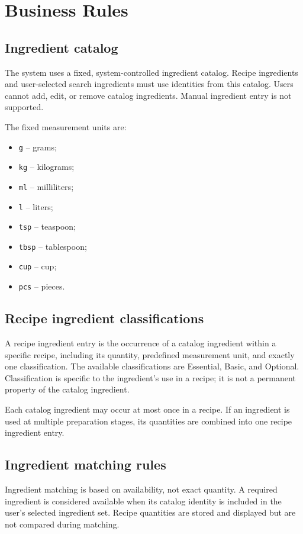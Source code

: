 \documentclass[12pt]{article}
\begin{document}
\section{Business Rules}

\subsection{Ingredient catalog}
The system uses a fixed, system-controlled ingredient catalog. Recipe ingredients and user-selected search ingredients must use identities from this catalog. Users cannot add, edit, or remove catalog ingredients. Manual ingredient entry is not supported.

The fixed measurement units are:
\begin{itemize}
    \item \texttt{g} -- grams;
    \item \texttt{kg} -- kilograms;
    \item \texttt{ml} -- milliliters;
    \item \texttt{l} -- liters;
    \item \texttt{tsp} -- teaspoon;
    \item \texttt{tbsp} -- tablespoon;
    \item \texttt{cup} -- cup;
    \item \texttt{pcs} -- pieces.
\end{itemize}

\subsection{Recipe ingredient classifications}
A recipe ingredient entry is the occurrence of a catalog ingredient within a specific recipe, including its quantity, predefined measurement unit, and exactly one classification. The available classifications are Essential, Basic, and Optional. Classification is specific to the ingredient's use in a recipe; it is not a permanent property of the catalog ingredient.

Each catalog ingredient may occur at most once in a recipe. If an ingredient is used at multiple preparation stages, its quantities are combined into one recipe ingredient entry.

\subsection{Ingredient matching rules}
Ingredient matching is based on availability, not exact quantity. A required ingredient is considered available when its catalog identity is included in the user's selected ingredient set. Recipe quantities are stored and displayed but are not compared during matching.
\end{document}
